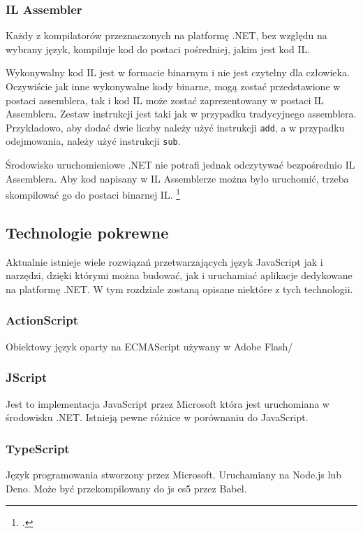 \documentclass[a4paper]{article}
\begin{document}
\subsubsection{IL Assembler}
\par Każdy z kompilatorów przeznaczonych na platformę .NET, bez względu na wybrany język, kompiluje kod do postaci pośredniej, jakim jest kod IL.
\par Wykonywalny kod IL jest w formacie binarnym i nie jest czytelny dla człowieka. Oczywiście jak inne wykonywalne kody binarne, mogą zostać przedstawione w postaci assemblera, tak i kod IL może zostać zaprezentowany w postaci IL Assemblera. Zestaw instrukcji jest taki jak w przypadku tradycyjnego assemblera. Przykładowo, aby dodać dwie liczby należy użyć instrukcji \texttt{add}, a w przypadku odejmowania, należy użyć instrukcji \texttt{sub}.
\par Środowisko uruchomieniowe .NET nie potrafi jednak odczytywać bezpośrednio IL Assemblera. Aby kod napisany w IL Assemblerze można było uruchomić, trzeba skompilować go do postaci binarnej IL. \footcite{ILAsm1}

\subsection{Technologie pokrewne}
Aktualnie istnieje wiele rozwiązań przetwarzających język JavaScript jak i narzędzi, dzięki którymi można budować, jak i uruchamiać aplikacje dedykowane na platformę .NET. W tym rozdziale zostaną opisane niektóre z tych technologii.


\subsubsection{ActionScript}
Obiektowy język oparty na ECMAScript używany w Adobe Flash/

\subsubsection{JScript}
Jest to implementacja JavaScript przez Microsoft która jest uruchomiana w środowisku .NET.
Istnieją pewne różnice w porównaniu do JavaScript.

\subsubsection{TypeScript}
Język programowania stworzony przez Microsoft. Uruchamiany na Node.js lub Deno. Może być przekompilowany do js es5 przez Babel.
\end{document}

